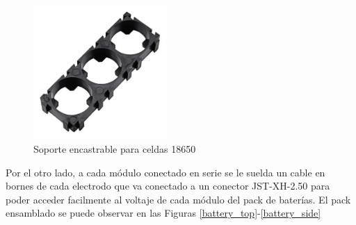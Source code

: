 \documentclass[10pt, a4paper]{report}
\begin{document}
\begin{figure}[h!]
    \begin{center}
        \includegraphics[width=0.45\textwidth]{soporte_18650.png}
        \caption{Soporte encastrable para celdas 18650}
        \label{soporte_18650}
    \end{center}
\end{figure}
\FloatBarrier

Por el otro lado, a cada m\'odulo conectado en serie se le suelda un cable en
bornes de cada electrodo que va conectado a un conector JST-XH-2.50 para poder
acceder facilmente al voltaje de cada m\'odulo del pack de bater\'ias. El pack
ensamblado se puede observar en las Figuras \ref{battery_top}-\ref{battery_side}
\end{document}
